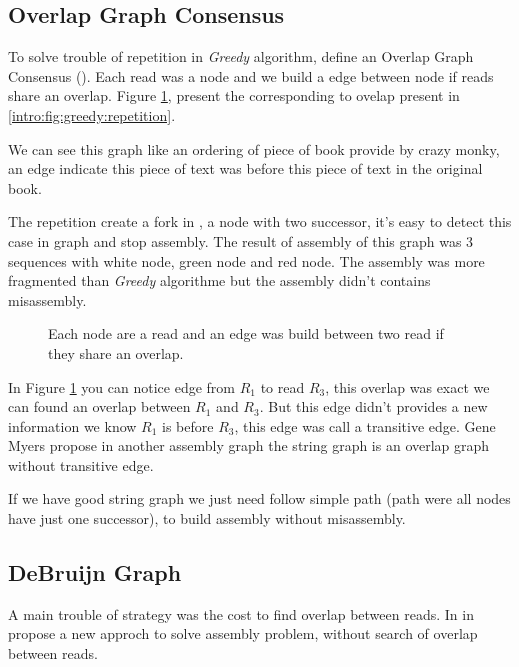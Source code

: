 \documentclass[main.tex]{subfiles}
\begin{document}
\subsection{Overlap Graph Consensus}

To solve trouble of repetition in \textit{Greedy} algorithm,  define an Overlap Graph Consensus (\OLC). Each read was a node and we build a edge between node if reads share an overlap. Figure \ref{intro:fig:olc:graph}, present the \OLC corresponding to ovelap present in \ref{intro:fig:greedy:repetition}.

We can see this graph like an ordering of piece of book provide by crazy monky, an edge indicate this piece of text was before this piece of text in the original book.

The repetition create a fork in \OLC, a node with two successor, it's easy to detect this case in graph and stop assembly. The result of assembly of this graph was 3 sequences with white node, green node and red node. The assembly was more fragmented than \textit{Greedy} algorithme but the assembly didn't contains misassembly.

\begin{figure}[ht]
    \centering 
    
    \caption{Each node are a read and an edge was build between two read if they share an overlap.}
    \label{intro:fig:olc:graph}
\end{figure}

In Figure \ref{intro:fig:olc:graph} you can notice edge from $R_1$ to read $R_3$, this overlap was exact we can found an overlap between $R_1$ and $R_3$. But this edge didn't provides a new information we know $R_1$ is before $R_3$, this edge was call a transitive edge. Gene Myers propose in \cite{string_graph} another assembly graph the string graph is an overlap graph without transitive edge.

If we have good string graph we just need follow simple path (path were all nodes have just one successor), to build assembly without misassembly.

\subsection{DeBruijn Graph}

A main trouble of \OLC strategy was the cost to find overlap between reads. In \citeauthor{eulerian_approach} in \cite{eulerian_approach} propose a new approch to solve assembly problem, without search of overlap between reads.
\end{document}
